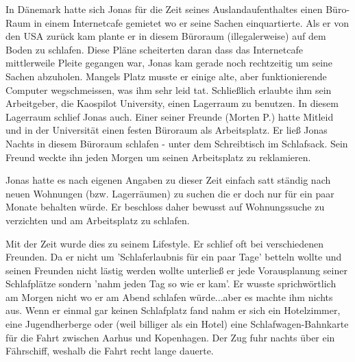 \documentclass[10pt,a4paper,ngerman,twoside]{article} %
\begin{document}
In Dänemark hatte sich Jonas für die Zeit seines Auslandaufenthaltes einen Büro-Raum in einem Internetcafe gemietet wo er seine Sachen einquartierte. Als er von den USA zurück kam plante er in diesem Büroraum (illegalerweise) auf dem Boden zu schlafen. Diese Pläne scheiterten daran dass das Internetcafe mittlerweile Pleite gegangen war, Jonas kam gerade noch rechtzeitig um seine Sachen abzuholen. Mangels Platz musste er einige alte, aber funktionierende Computer wegschmeissen, was ihm sehr leid tat. Schließlich erlaubte ihm sein Arbeitgeber, die Kaospilot University, einen Lagerraum zu benutzen. In diesem Lagerraum schlief Jonas auch. Einer seiner Freunde (Morten P.) hatte Mitleid und in der Universität einen festen Büroraum als Arbeitsplatz. Er ließ Jonas Nachts in diesem Büroraum schlafen -  unter dem Schreibtisch im Schlafsack. Sein Freund weckte ihn jeden Morgen um seinen Arbeitsplatz zu reklamieren.

Jonas hatte es nach eigenen Angaben zu dieser Zeit einfach satt ständig nach neuen Wohnungen (bzw. Lagerräumen) zu suchen die er doch nur für ein paar Monate behalten würde. Er beschloss daher bewusst auf Wohnungssuche zu verzichten und am Arbeitsplatz zu schlafen. 

Mit der Zeit wurde dies zu seinem Lifestyle. Er schlief oft bei verschiedenen Freunden. Da er nicht um 'Schlaferlaubnis für ein paar Tage' betteln wollte und seinen Freunden nicht lästig werden wollte unterließ er jede Vorausplanung seiner Schlafplätze sondern 'nahm jeden Tag so wie er kam'. Er wusste sprichwörtlich am Morgen nicht wo er am Abend schlafen würde...aber es machte ihm nichts aus. Wenn er einmal gar keinen Schlafplatz fand nahm er sich ein Hotelzimmer, eine Jugendherberge oder (weil billiger als ein Hotel) eine Schlafwagen-Bahnkarte für die Fahrt zwischen Aarhus und Kopenhagen. Der Zug fuhr nachts über ein Fährschiff, weshalb die Fahrt recht lange dauerte. 

\end{document}
